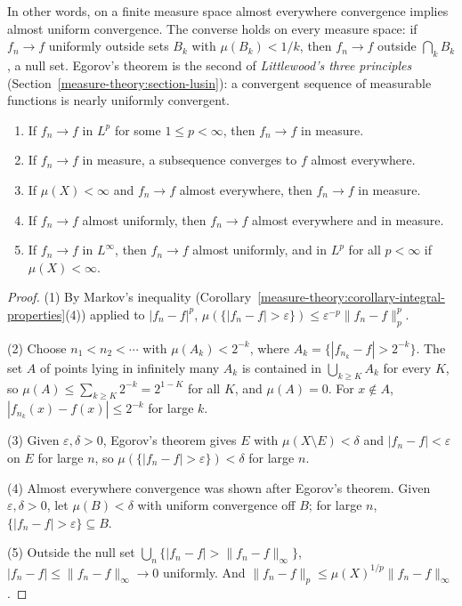 In other words, on a finite measure space almost everywhere convergence implies almost uniform convergence. The converse holds on every measure space: if $f_n \to f$ uniformly outside sets $B_k$
with $\mu(B_k) < 1/k$, then $f_n \to f$ outside $\bigcap_kB_k$, a null set. Egorov's theorem is the second of \emph{Littlewood's three principles} (Section~\ref{measure-theory:section-lusin}): a
convergent sequence of measurable functions is nearly uniformly convergent.

\begin{proposition}\label{measure-theory:proposition-modes}
\begin{enumerate}
\item If $f_n \to f$ in $L^p$ for some $1 \leq p < \infty$, then $f_n \to f$ in measure.
\item If $f_n \to f$ in measure, a subsequence converges to $f$ almost everywhere.
\item If $\mu(X) < \infty$ and $f_n \to f$ almost everywhere, then $f_n \to f$ in measure.
\item If $f_n \to f$ almost uniformly, then $f_n \to f$ almost everywhere and in measure.
\item If $f_n \to f$ in $L^\infty$, then $f_n \to f$ almost uniformly, and in $L^p$ for all $p < \infty$ if $\mu(X) < \infty$.
\end{enumerate}
\end{proposition}

\begin{proof}
(1) By Markov's inequality (Corollary~\ref{measure-theory:corollary-integral-properties}(4)) applied to $|f_n - f|^p$, $\mu(\{|f_n - f| > \varepsilon\}) \leq \varepsilon^{-p}\|f_n - f\|_p^p$.

(2) Choose $n_1 < n_2 < \cdots$ with $\mu(A_k) < 2^{-k}$, where $A_k = \{|f_{n_k} - f| > 2^{-k}\}$. The set $A$ of points lying in infinitely many $A_k$ is contained in $\bigcup_{k \geq K}A_k$ for every $K$,
so $\mu(A) \leq \sum_{k \geq K}2^{-k} = 2^{1-K}$ for all $K$, and $\mu(A) = 0$. For $x \notin A$, $|f_{n_k}(x) - f(x)| \leq 2^{-k}$ for large $k$.

(3) Given $\varepsilon, \delta > 0$, Egorov's theorem gives $E$ with $\mu(X \setminus E) < \delta$ and $|f_n - f| < \varepsilon$ on $E$ for large $n$, so $\mu(\{|f_n - f| > \varepsilon\}) < \delta$ for large $n$.

(4) Almost everywhere convergence was shown after Egorov's theorem. Given $\varepsilon, \delta > 0$, let $\mu(B) < \delta$ with uniform convergence off $B$; for large $n$, $\{|f_n - f| > \varepsilon\} \subseteq B$.

(5) Outside the null set $\bigcup_n\{|f_n - f| > \|f_n - f\|_\infty\}$, $|f_n - f| \leq \|f_n - f\|_\infty \to 0$ uniformly. And $\|f_n - f\|_p \leq \mu(X)^{1/p}\|f_n - f\|_\infty$.
\end{proof}

